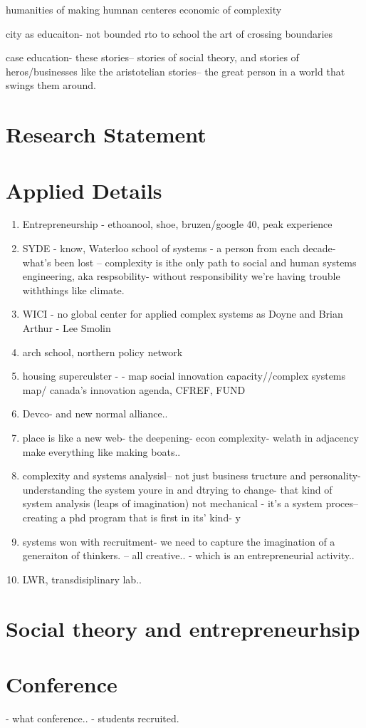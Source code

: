 humanities of making
humnan centeres economic of complexity

city as educaiton- not bounded rto to school the art of crossing boundaries


case education- these stories-- stories of social theory, and stories of heros/businesses like the aristotelian stories-- the great person in a world that swings them around.


\section{Research Statement}




\section{Applied Details}

\begin{enumerate}
    \item Entrepreneurship - ethoanool, shoe, bruzen/google 40, peak experience 
    \item SYDE - know, Waterloo school of systems - a person from each decade- what's been lost -- complexity is ithe only path to social and human systems engineering, aka respsobility- without responsibility we're having trouble withthings like climate.
    \item WICI - no global center for applied complex systems as Doyne and Brian Arthur - Lee Smolin
    \item arch school, northern policy network
    \item housing superculster -  - map social innovation capacity//complex systems map/ canada's innovation agenda, CFREF, FUND
    \item Devco- and new normal alliance.. 
    \item place is like a new web- the deepening- econ complexity- welath in adjacency  make everything like making boats..
    \item complexity and systems analysisl-- not just business tructure and personality- understanding the system youre in and dtrying to change- that kind of system analysis (leaps of imagination) not mechanical - it's a system proces-- creating a phd program that is first in its' kind- y
    \item systems won with recruitment- we need to capture the imagination of a generaiton of thinkers. -- all creative.. - which is an entrepreneurial activity.. \item LWR, transdisiplinary lab..
\end{enumerate}

\section{Social theory and entrepreneurhsip}




\section{Conference}

- what conference..
- students recruited.




